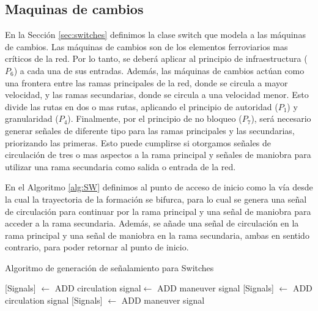 \subsection{Maquinas de cambios}
	\label{sec:signal_switches}
	
    
    En la Sección \ref{sec:switches} definimos la clase switch que modela a las máquinas de cambios. Las máquinas de cambios son de los elementos ferroviarios mas críticos de la red. Por lo tanto, se deberá aplicar al principio de infraestructura ($P_6$) a cada una de sus entradas. Además, las máquinas de cambios actúan como una frontera entre las ramas principales de la red, donde se circula a mayor velocidad, y las ramas secundarias, donde se circula a una velocidad menor. Esto divide las rutas en dos o mas rutas, aplicando el principio de autoridad ($P_1$) y granularidad ($P_4$). Finalmente, por el principio de no bloqueo ($P_7$), será necesario generar señales de diferente tipo para las ramas principales y las secundarias, priorizando las primeras. Esto puede cumplirse si otorgamos señales de circulación de tres o mas aspectos a la rama principal y señales de maniobra para utilizar una rama secundaria como salida o entrada de la red.
    
    En el Algoritmo \ref{alg:SW} definimos al punto de acceso de inicio como la vía desde la cual la trayectoria de la formación se bifurca, para lo cual se genera una señal de circulación para continuar por la rama principal y una señal de maniobra para acceder a la rama secundaria. Además, se añade una señal de circulación en la rama principal y una señal de maniobra en la rama secundaria, ambas en sentido contrario, para poder retornar al punto de inicio. 
    
    \begin{algorithm}[H]
        \caption{Algoritmo de generación de señalamiento para Switches}\label{alg:SW}
        \DontPrintSemicolon
        \SetNoFillComment
        \LinesNotNumbered 
        {
            {
                {
                    [Signals] $\gets$ ADD circulation signal\;
                    [Signals] $\gets$ ADD maneuver signal\;
                }
                {
                    [Signals] $\gets$ ADD circulation signal\;
                }
                {
                    [Signals] $\gets$ ADD maneuver signal\;
                }
            }   
        }
        \KwResult{[Signals]} 
    \end{algorithm}


